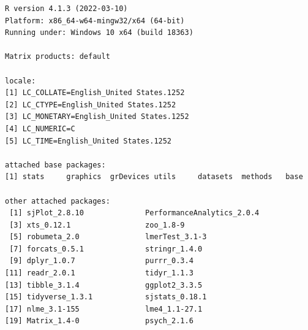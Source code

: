 \documentclass[
  11pt,
]{book}
\begin{document}
\begin{verbatim}
R version 4.1.3 (2022-03-10)
Platform: x86_64-w64-mingw32/x64 (64-bit)
Running under: Windows 10 x64 (build 18363)

Matrix products: default

locale:
[1] LC_COLLATE=English_United States.1252 
[2] LC_CTYPE=English_United States.1252   
[3] LC_MONETARY=English_United States.1252
[4] LC_NUMERIC=C                          
[5] LC_TIME=English_United States.1252    

attached base packages:
[1] stats     graphics  grDevices utils     datasets  methods   base     

other attached packages:
 [1] sjPlot_2.8.10              PerformanceAnalytics_2.0.4
 [3] xts_0.12.1                 zoo_1.8-9                 
 [5] robumeta_2.0               lmerTest_3.1-3            
 [7] forcats_0.5.1              stringr_1.4.0             
 [9] dplyr_1.0.7                purrr_0.3.4               
[11] readr_2.0.1                tidyr_1.1.3               
[13] tibble_3.1.4               ggplot2_3.3.5             
[15] tidyverse_1.3.1            sjstats_0.18.1            
[17] nlme_3.1-155               lme4_1.1-27.1             
[19] Matrix_1.4-0               psych_2.1.6               


\end{verbatim}
\end{document}
